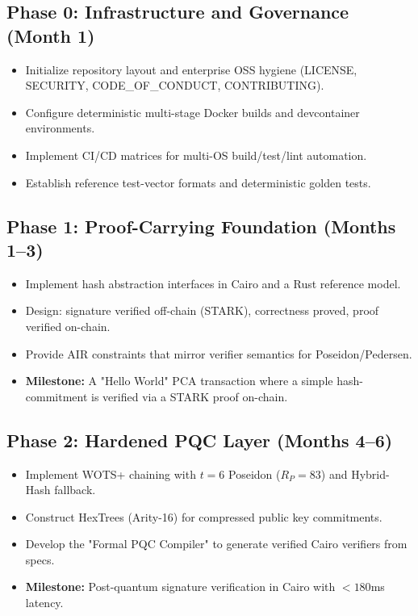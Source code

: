 \documentclass[conference]{IEEEtran}
\theoremstyle{definition}
\theoremstyle{plain}
\theoremstyle{remark}
\begin{document}
\subsection{Phase 0: Infrastructure and Governance (Month 1)}
\begin{itemize}
\item Initialize repository layout and enterprise OSS hygiene (LICENSE, SECURITY, CODE\_OF\_CONDUCT, CONTRIBUTING).
\item Configure deterministic multi-stage Docker builds and devcontainer environments.
\item Implement CI/CD matrices for multi-OS build/test/lint automation.
\item Establish reference test-vector formats and deterministic golden tests.
\end{itemize}

\subsection{Phase 1: Proof-Carrying Foundation (Months 1--3)}
\begin{itemize}
\item Implement hash abstraction interfaces in Cairo and a Rust reference model.
\item Design: signature verified off-chain (STARK), correctness proved, proof verified on-chain.
\item Provide AIR constraints that mirror verifier semantics for Poseidon/Pedersen.
\item \textbf{Milestone:} A "Hello World" PCA transaction where a simple hash-commitment is verified via a STARK proof on-chain.
\end{itemize}

\subsection{Phase 2: Hardened PQC Layer (Months 4--6)}
\begin{itemize}
\item Implement WOTS+ chaining with $t=6$ Poseidon ($R_P=83$) and Hybrid-Hash fallback.
\item Construct HexTrees (Arity-16) for compressed public key commitments.
\item Develop the "Formal PQC Compiler" to generate verified Cairo verifiers from specs.
\item \textbf{Milestone:} Post-quantum signature verification in Cairo with $<180$ms latency.
\end{itemize}
\end{document}
